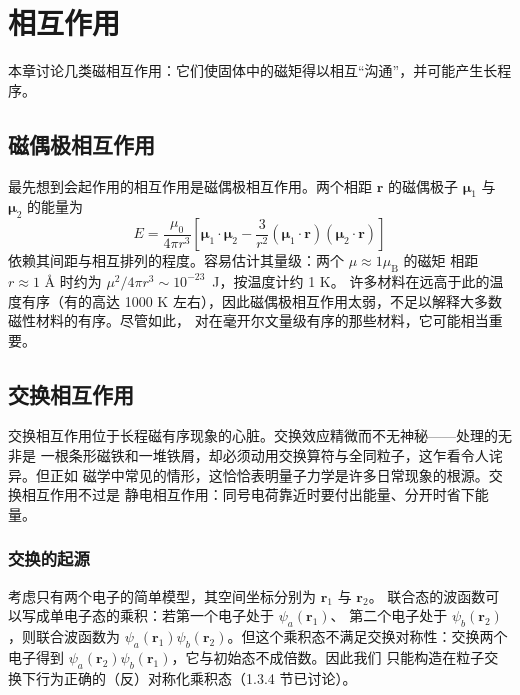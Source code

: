 \chapter{相互作用}

本章讨论几类磁相互作用：它们使固体中的磁矩得以相互“沟通”，并可能产生长程序。

\section{磁偶极相互作用}

最先想到会起作用的相互作用是磁偶极相互作用。两个相距 $\mathbf{r}$ 的磁偶极子
$\boldsymbol{\mu}_1$ 与 $\boldsymbol{\mu}_2$ 的能量为
\begin{equation*}
E = \frac{\mu_0}{4\pi r^{3}}\left[\boldsymbol{\mu}_1\cdot\boldsymbol{\mu}_2 - \frac{3}{r^{2}}(\boldsymbol{\mu}_1\cdot\mathbf{r})(\boldsymbol{\mu}_2\cdot\mathbf{r})\right]\tag{4.1}
\end{equation*}
依赖其间距与相互排列的程度。容易估计其量级：两个 $\mu\approx1\mu_{\mathrm{B}}$ 的磁矩
相距 $r\approx1$ \AA{} 时约为 $\mu^{2}/4\pi r^{3}\sim10^{-23}$~J，按温度计约 1 K。
许多材料在远高于此的温度有序（有的高达
1000 K 左右），因此磁偶极相互作用太弱，不足以解释大多数磁性材料的有序。尽管如此，
对在毫开尔文量级有序的那些材料，它可能相当重要。

\section{交换相互作用}

交换相互作用位于长程磁有序现象的心脏。交换效应精微而不无神秘——处理的无非是
一根条形磁铁和一堆铁屑，却必须动用交换算符与全同粒子，这乍看令人诧异。但正如
磁学中常见的情形，这恰恰表明量子力学是许多日常现象的根源。交换相互作用不过是
静电相互作用：同号电荷靠近时要付出能量、分开时省下能量。

\subsection{交换的起源}

考虑只有两个电子的简单模型，其空间坐标分别为 $\mathbf{r}_1$ 与 $\mathbf{r}_2$。
联合态的波函数可以写成单电子态的乘积：若第一个电子处于 $\psi_a(\mathbf{r}_1)$、
第二个电子处于 $\psi_b(\mathbf{r}_2)$，则联合波函数为
$\psi_a(\mathbf{r}_1)\psi_b(\mathbf{r}_2)$。但这个乘积态不满足交换对称性：交换两个
电子得到 $\psi_a(\mathbf{r}_2)\psi_b(\mathbf{r}_1)$，它与初始态不成倍数。因此我们
只能构造在粒子交换下行为正确的（反）对称化乘积态（1.3.4 节已讨论）。

